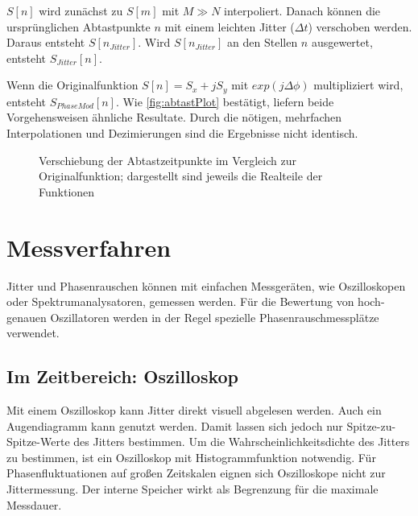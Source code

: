 $S[n]$ wird zunächst zu $S[m]$ mit $M \gg N$ interpoliert. Danach können die ursprünglichen Abtastpunkte $n$ mit einem leichten Jitter ($\Delta t$) verschoben werden. Daraus entsteht $S[n_{Jitter}]$. Wird $S[n_{Jitter}]$ an den Stellen $n$ ausgewertet, entsteht $S_{Jitter}[n]$.

Wenn die Originalfunktion $S[n]=S_x+j S_y$ mit $exp(j \Delta \phi)$ multipliziert wird, entsteht $S_{PhaseMod}[n]$. Wie \autoref{fig:abtastPlot} bestätigt, liefern beide Vorgehensweisen ähnliche Resultate. Durch die nötigen, mehrfachen Interpolationen und Dezimierungen sind die Ergebnisse nicht identisch. 

\begin{figure}[H]
	\centering
	\caption[Verschiebung Abtastzeitpunkte]{Verschiebung der Abtastzeitpunkte im Vergleich zur Originalfunktion; dargestellt sind jeweils die Realteile der Funktionen}
	\label{fig:abtastPlot}
\end{figure}




\section{Messverfahren}
Jitter und Phasenrauschen können mit einfachen Messgeräten, wie Oszilloskopen oder Spektrumanalysatoren, gemessen werden. Für die Bewertung von hoch-genauen Oszillatoren werden in der Regel spezielle Phasenrauschmessplätze verwendet.

\subsection{Im Zeitbereich: Oszilloskop}
Mit einem Oszilloskop kann Jitter direkt visuell abgelesen werden. Auch ein Augendiagramm kann genutzt werden. Damit lassen sich jedoch nur Spitze-zu-Spitze-Werte des Jitters bestimmen. Um die Wahrscheinlichkeitsdichte des Jitters zu bestimmen, ist ein Oszilloskop mit Histogrammfunktion notwendig. Für Phasenfluktuationen auf großen Zeitskalen eignen sich Oszilloskope nicht zur Jittermessung. Der interne Speicher wirkt als Begrenzung für die maximale Messdauer.


